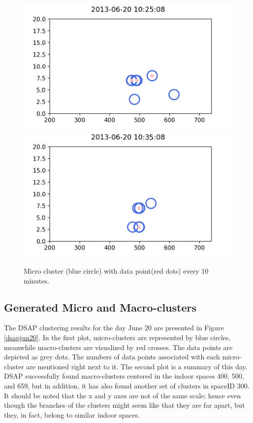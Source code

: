 \begin{figure}[!ht]
        \includegraphics[width = 5 cm]{image/Chapters/Chapter6/value327.png}\hfill
        \includegraphics[width = 5 cm]{image/Chapters/Chapter6/value343.png}\hfill
    \caption{Micro cluster (blue circle) with data point(red dots) every 10 minutes.}
    \label{drift}
\end{figure}



\subsection{Generated Micro and Macro-clusters}




The DSAP clustering results for the day June 20 are presented in Figure \ref{dsapjun20}. In the first plot, micro-clusters are represented by blue circles, meanwhile macro-clusters are visualized by red crosses. The data points are depicted as grey dots. The numbers of data points associated with each micro-cluster are mentioned right next to it. The second plot is a summary of this day. DSAP successfully found macro-clusters centered in the indoor spaces 400, 500, and 659, but in addition, it has also found another set of clusters in spaceID 300. It should be noted that the x and y axes are not of the same scale; hence even though the branches of the clusters might seem like that they are far apart, but they, in fact, belong to similar indoor spaces.


 
